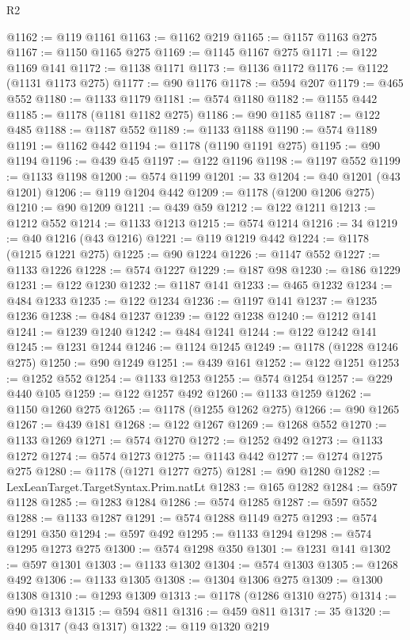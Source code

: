 \begin{lexlean}{R2}
\begin{coremodule}
{{{{{{{{{{{{{{{{{{{{{{{{{{{{{{{{{{{{{{{{{{{{{{{{{{{{{{{{{{{{{{{{{{{{{{{{{{{{{{{{{{{{{{{{{{{{@1162 := @119 @1161
@1163 := @1162 @219
@1165 := @1157 @1163 @275
@1167 := @1150 @1165 @275
@1169 := @1145 @1167 @275
@1171 := @122 @1169 @141
@1172 := @1138 @1171
@1173 := @1136 @1172
@1176 := @1122 (@1131 @1173 @275)
@1177 := @90 @1176
@1178 := @594 @207
@1179 := @465 @552
@1180 := @1133 @1179
@1181 := @574 @1180
@1182 := @1155 @442
@1185 := @1178 (@1181 @1182 @275)
@1186 := @90 @1185
@1187 := @122 @485
@1188 := @1187 @552
@1189 := @1133 @1188
@1190 := @574 @1189
@1191 := @1162 @442
@1194 := @1178 (@1190 @1191 @275)
@1195 := @90 @1194
@1196 := @439 @45
@1197 := @122 @1196
@1198 := @1197 @552
@1199 := @1133 @1198
@1200 := @574 @1199
@1201 := 33
@1204 := @40 @1201 (@43 @1201)
@1206 := @119 @1204 @442
@1209 := @1178 (@1200 @1206 @275)
@1210 := @90 @1209
@1211 := @439 @59
@1212 := @122 @1211
@1213 := @1212 @552
@1214 := @1133 @1213
@1215 := @574 @1214
@1216 := 34
@1219 := @40 @1216 (@43 @1216)
@1221 := @119 @1219 @442
@1224 := @1178 (@1215 @1221 @275)
@1225 := @90 @1224
@1226 := @1147 @552
@1227 := @1133 @1226
@1228 := @574 @1227
@1229 := @187 @98
@1230 := @186 @1229
@1231 := @122 @1230
@1232 := @1187 @141
@1233 := @465 @1232
@1234 := @484 @1233
@1235 := @122 @1234
@1236 := @1197 @141
@1237 := @1235 @1236
@1238 := @484 @1237
@1239 := @122 @1238
@1240 := @1212 @141
@1241 := @1239 @1240
@1242 := @484 @1241
@1244 := @122 @1242 @141
@1245 := @1231 @1244
@1246 := @1124 @1245
@1249 := @1178 (@1228 @1246 @275)
@1250 := @90 @1249
@1251 := @439 @161
@1252 := @122 @1251
@1253 := @1252 @552
@1254 := @1133 @1253
@1255 := @574 @1254
@1257 := @229 @440 @105
@1259 := @122 @1257 @492
@1260 := @1133 @1259
@1262 := @1150 @1260 @275
@1265 := @1178 (@1255 @1262 @275)
@1266 := @90 @1265
@1267 := @439 @181
@1268 := @122 @1267
@1269 := @1268 @552
@1270 := @1133 @1269
@1271 := @574 @1270
@1272 := @1252 @492
@1273 := @1133 @1272
@1274 := @574 @1273
@1275 := @1143 @442
@1277 := @1274 @1275 @275
@1280 := @1178 (@1271 @1277 @275)
@1281 := @90 @1280
@1282 := LexLeanTarget.TargetSyntax.Prim.natLt
@1283 := @165 @1282
@1284 := @597 @1128
@1285 := @1283 @1284
@1286 := @574 @1285
@1287 := @597 @552
@1288 := @1133 @1287
@1291 := @574 @1288 @1149 @275
@1293 := @574 @1291 @350
@1294 := @597 @492
@1295 := @1133 @1294
@1298 := @574 @1295 @1273 @275
@1300 := @574 @1298 @350
@1301 := @1231 @141
@1302 := @597 @1301
@1303 := @1133 @1302
@1304 := @574 @1303
@1305 := @1268 @492
@1306 := @1133 @1305
@1308 := @1304 @1306 @275
@1309 := @1300 @1308
@1310 := @1293 @1309
@1313 := @1178 (@1286 @1310 @275)
@1314 := @90 @1313
@1315 := @594 @811
@1316 := @459 @811
@1317 := 35
@1320 := @40 @1317 (@43 @1317)
@1322 := @119 @1320 @219
}}}}}}}}}}}}}}}}}}}}}}}}}}}}}}}}}}}}}}}}}}}}}}}}}}}}}}}}}}}}}}}}}}}}}}}}}}}}}}}}}}}}}}}}}}}}
\end{coremodule}
\end{lexlean}

